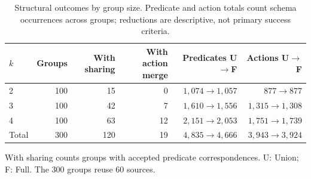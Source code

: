 \begin{table}[htbp]
\centering\small
\caption{Structural outcomes by group size. Predicate and action totals count schema occurrences across groups; reductions are descriptive, not primary success criteria.}
\label{tab:models}
\begin{tabular}{lrrrrr}
\toprule
$k$ & Groups & With sharing & With action merge & Predicates U$\to$F & Actions U$\to$F \\
\midrule
2 & 100 & 15 & 0 & $1,074\to 1,057$ & $877\to 877$ \\
3 & 100 & 42 & 7 & $1,610\to 1,556$ & $1,315\to 1,308$ \\
4 & 100 & 63 & 12 & $2,151\to 2,053$ & $1,751\to 1,739$ \\
Total & 300 & 120 & 19 & $4,835\to 4,666$ & $3,943\to 3,924$ \\
\bottomrule
\end{tabular}
\par\smallskip\begin{minipage}{0.97\linewidth}\small With sharing counts groups with accepted predicate correspondences. U: Union; F: Full. The 300 groups reuse 60 sources.\end{minipage}
\end{table}
